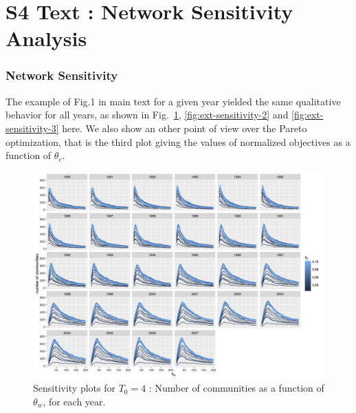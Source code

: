 \documentclass[12pt,twoside,a4paper]{article}
\begin{document}
\section*{S4 Text : Network Sensitivity Analysis \label{app:sensitivity}}


\subsubsection*{Network Sensitivity}

The example of Fig.1 in main text for a given year yielded the same qualitative behavior for all years, as shown in Fig.~\ref{fig:ext-sensitivity-1}, \ref{fig:ext-sensitivity-2} and \ref{fig:ext-sensitivity-3} here.  We also show an other point of view over the Pareto optimization, that is the third plot giving the values of normalized objectives as a function of $\theta_c$.


\begin{figure}
\centering
\includegraphics[width=\textheight,height=\textwidth,angle=90]{commnum_thetaw_byyears.png}
\caption{Sensitivity plots for $T_0 = 4$ : Number of communities as a function of $\theta_w$, for each year.}
\label{fig:ext-sensitivity-1}
\end{figure}
\end{document}
